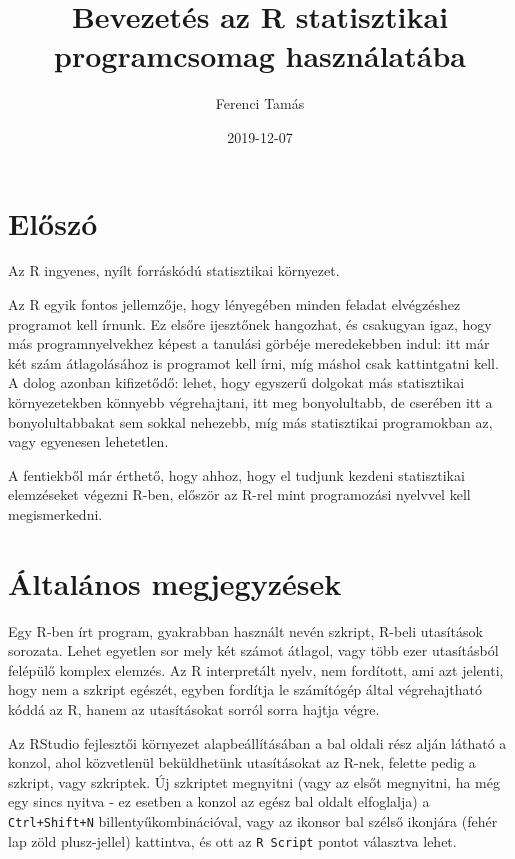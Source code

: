 \documentclass[
]{book}
\title{Bevezetés az R statisztikai programcsomag használatába}
\author{Ferenci Tamás}
\date{2019-12-07}
\begin{document}
\frontmatter
\maketitle

{
\setcounter{tocdepth}{1}
\tableofcontents
}
\mainmatter
\hypertarget{elux151szuxf3}{%
\chapter{Előszó}\label{elux151szuxf3}}

Az R ingyenes, nyílt forráskódú statisztikai környezet.

Az R egyik fontos jellemzője, hogy lényegében minden feladat elvégzéshez programot kell írnunk. Ez elsőre ijesztőnek hangozhat, és csakugyan igaz, hogy más programnyelvekhez képest a tanulási görbéje meredekebben indul: itt már két szám átlagolásához is programot kell írni, míg máshol csak kattintgatni kell. A dolog azonban kifizetődő: lehet, hogy egyszerű dolgokat más statisztikai környezetekben könnyebb végrehajtani, itt meg bonyolultabb, de cserében itt a bonyolultabbakat sem sokkal nehezebb, míg más statisztikai programokban az, vagy egyenesen lehetetlen.

A fentiekből már érthető, hogy ahhoz, hogy el tudjunk kezdeni statisztikai elemzéseket végezni R-ben, először az R-rel mint programozási nyelvvel kell megismerkedni.

\hypertarget{uxe1ltaluxe1nos-megjegyzuxe9sek}{%
\chapter{Általános megjegyzések}\label{uxe1ltaluxe1nos-megjegyzuxe9sek}}

Egy R-ben írt program, gyakrabban használt nevén szkript, R-beli utasítások sorozata. Lehet egyetlen sor mely két számot átlagol, vagy több ezer utasításból felépülő komplex elemzés. Az R interpretált nyelv, nem fordított, ami azt jelenti, hogy nem a szkript egészét, egyben fordítja le számítógép által végrehajtható kóddá az R, hanem az utasításokat sorról sorra hajtja végre.

Az RStudio fejlesztői környezet alapbeállításában a bal oldali rész alján látható a konzol, ahol közvetlenül beküldhetünk utasításokat az R-nek, felette pedig a szkript, vagy szkriptek. Új szkriptet megnyitni (vagy az elsőt megnyitni, ha még egy sincs nyitva - ez esetben a konzol az egész bal oldalt elfoglalja) a \texttt{Ctrl+Shift+N} billentyűkombinációval, vagy az ikonsor bal szélső ikonjára (fehér lap zöld plusz-jellel) kattintva, és ott az \texttt{R\ Script} pontot választva lehet.
\end{document}
